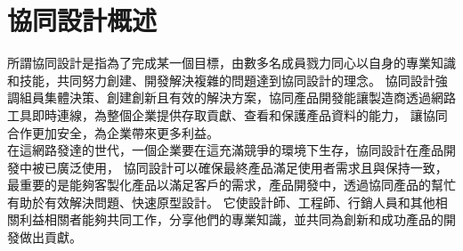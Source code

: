 \chapter{協同設計概述}
\renewcommand{\baselinestretch}{10.0} %


\fontsize{14pt}{2.5pt}\sectionef\hspace{12pt}


所謂協同設計是指為了完成某一個目標，由數多名成員戮力同心以自身的專業知識和技能，共同努力創建、開發解決複雜的問題達到協同設計的理念。
協同設計強調組員集體決策、創建創新且有效的解決方案，協同產品開發能讓製造商透過網路工具即時連線，為整個企業提供存取貢獻、查看和保護產品資料的能力，
讓協同合作更加安全，為企業帶來更多利益。\\



在這網路發達的世代，一個企業要在這充滿競爭的環境下生存，協同設計在產品開發中被已廣泛使用，
協同設計可以確保最終產品滿足使用者需求且與保持一致，最重要的是能夠客製化產品以滿足客戶的需求，產品開發中，透過協同產品的幫忙有助於有效解決問題、快速原型設計。
它使設計師、工程師、行銷人員和其他相關利益相關者能夠共同工作，分享他們的專業知識，並共同為創新和成功產品的開發做出貢獻。\\



\newpage

\renewcommand{\baselinestretch}{0.5} %